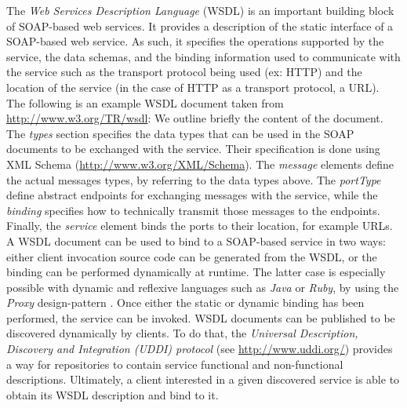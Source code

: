 The \emph{Web Services Description Language} (WSDL) \cite{ECFC+01} is an important building block of SOAP-based web services. It provides a description of the static interface of a SOAP-based web service. As such, it specifies the operations supported by the service, the data schemas, and the binding information used to communicate with the service such as the transport protocol being used (ex: HTTP) and the location of the service (in the case of HTTP as a transport protocol, a URL). The following is an example WSDL document taken from \url{http://www.w3.org/TR/wsdl}:
{\footnotesize }
We outline briefly the content of the document. The \emph{types} section specifies the data types that can be used in the SOAP documents to be exchanged with the service. Their specification is done using XML Schema (\url{http://www.w3.org/XML/Schema}). The \emph{message} elements define the actual messages types, by referring to the data types above. The \emph{portType} define abstract endpoints for exchanging messages with the service, while the \emph{binding} specifies how to technically transmit those messages to the endpoints. Finally, the \emph{service} element binds the ports to their location, for example URLs.\\

A WSDL document can be used to bind to a SOAP-based service in two ways: either client invocation source code can be generated from the WSDL, or the binding can be performed dynamically at runtime. The latter case is especially possible with dynamic and reflexive languages such as \emph{Java} or \emph{Ruby}, by using the \emph{Proxy} design-pattern \cite{Gamma95}. Once either the static or dynamic binding has been performed, the service can be invoked. WSDL documents can be published to be discovered dynamically by clients. To do that, the \emph{Universal Description, Discovery and Integration (UDDI) protocol} (see \url{http://www.uddi.org/}) provides a way for repositories to contain service functional and non-functional descriptions. Ultimately, a client interested in a given discovered service is able to obtain its WSDL description and bind to it.\\

